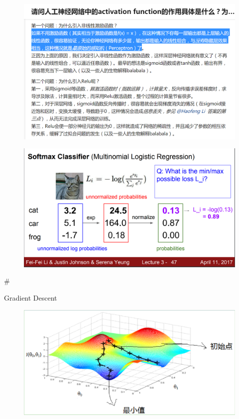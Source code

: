 \documentclass[11pt]{article}
\makeatletter
\def\maxwidth{\ifdim\Gin@nat@width>\linewidth\linewidth
    \else\Gin@nat@width\fi}
\let\Oldincludegraphics\includegraphics
\renewcommand{\includegraphics}[1]{\Oldincludegraphics[width=.8\maxwidth]{#1}}
\makeatother
\begin{document}
    \begin{figure}
\centering
\includegraphics{activation.png}
\caption{}
\end{figure}

    \begin{figure}
\centering
\includegraphics{loss.png}
\caption{}
\end{figure}

    \#

Gradient Descent

\begin{figure}
\centering
\includegraphics{gradient_descent.png}
\caption{}
\end{figure}
\end{document}
